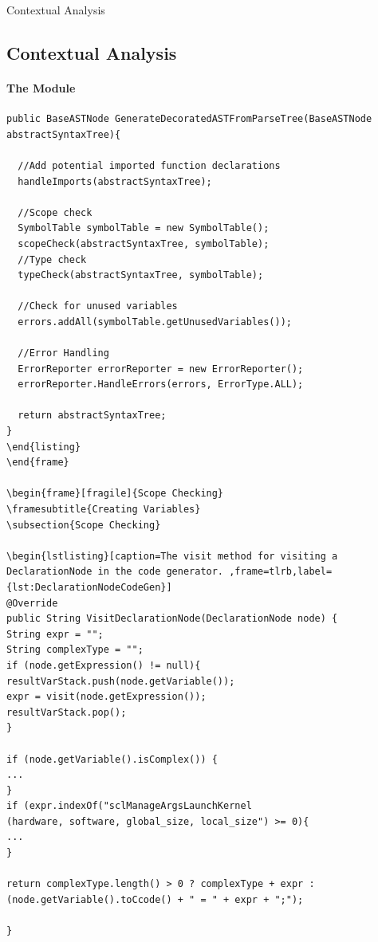 \begin{frame}[fragile]{Contextual Analysis}
\subsection{Contextual Analysis}
\framesubtitle{The Module}

\begin{lstlisting}
public BaseASTNode GenerateDecoratedASTFromParseTree(BaseASTNode abstractSyntaxTree){

  //Add potential imported function declarations
  handleImports(abstractSyntaxTree);

  //Scope check
  SymbolTable symbolTable = new SymbolTable();
  scopeCheck(abstractSyntaxTree, symbolTable);
  //Type check
  typeCheck(abstractSyntaxTree, symbolTable);

  //Check for unused variables
  errors.addAll(symbolTable.getUnusedVariables());

  //Error Handling
  ErrorReporter errorReporter = new ErrorReporter();
  errorReporter.HandleErrors(errors, ErrorType.ALL);

  return abstractSyntaxTree;
}
\end{listing}
\end{frame}

\begin{frame}[fragile]{Scope Checking}
\framesubtitle{Creating Variables}
\subsection{Scope Checking}

\begin{lstlisting}[caption=The visit method for visiting a DeclarationNode in the code generator. ,frame=tlrb,label={lst:DeclarationNodeCodeGen}]
@Override
public String VisitDeclarationNode(DeclarationNode node) {
String expr = "";
String complexType = "";
if (node.getExpression() != null){
resultVarStack.push(node.getVariable());
expr = visit(node.getExpression());
resultVarStack.pop();
}

if (node.getVariable().isComplex()) {
...
}
if (expr.indexOf("sclManageArgsLaunchKernel
(hardware, software, global_size, local_size") >= 0){
...
}

return complexType.length() > 0 ? complexType + expr :
(node.getVariable().toCcode() + " = " + expr + ";");

}
\end{lstlisting}

\end{frame}